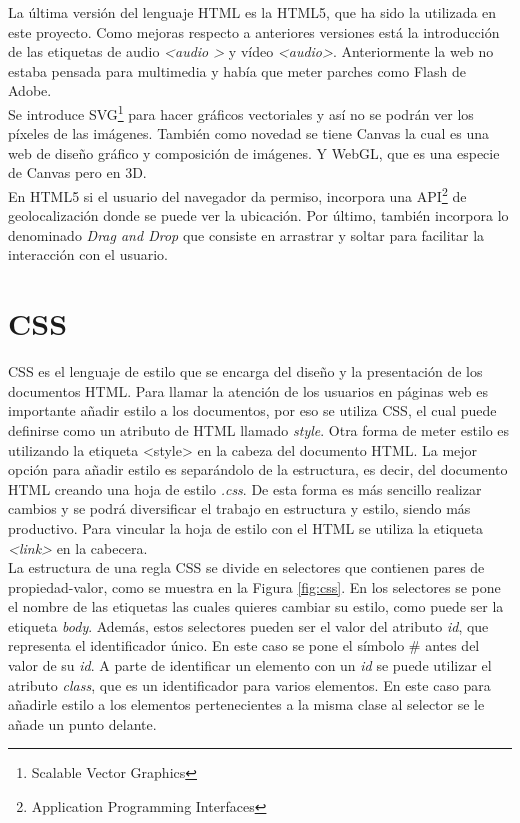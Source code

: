 La última versión del lenguaje HTML es la HTML5, que ha sido la utilizada en este proyecto. Como mejoras respecto a anteriores versiones está la introducción de las etiquetas de audio \textit{\textless audio \textgreater} y vídeo \textit{\textless audio\textgreater}. Anteriormente la web no estaba pensada para multimedia y había que meter parches como Flash de Adobe.\\

Se introduce SVG\footnote{Scalable Vector Graphics } para hacer gráficos vectoriales y así no se podrán ver los píxeles de las imágenes. También como novedad se tiene Canvas la cual es una web de diseño gráfico y composición de imágenes. Y WebGL, que es una especie de Canvas pero en 3D. \\

En HTML5 si el usuario del navegador da permiso, incorpora una API\footnote{Application Programming Interfaces} de geolocalización donde se puede ver la ubicación. Por último, también incorpora lo denominado \textit{Drag and Drop} que consiste en arrastrar y soltar para facilitar la interacción con el usuario.\\


\newpage
\section{CSS}
CSS es el lenguaje de estilo que se encarga del diseño y la presentación de los documentos HTML. Para llamar la atención de los usuarios en páginas web es importante añadir estilo a los documentos, por eso se utiliza CSS, el cual puede definirse como un atributo de HTML llamado \textit{style}. Otra forma de meter estilo es utilizando la etiqueta {\textless style\textgreater} en la cabeza del documento HTML. La mejor opción para añadir estilo es separándolo de la estructura, es decir, del documento HTML creando una hoja de estilo \textit{.css}. De esta forma es más sencillo realizar cambios y se podrá diversificar el trabajo en estructura y estilo, siendo más productivo. Para vincular la hoja de estilo con el HTML se utiliza la etiqueta \textit{\textless link\textgreater} en la cabecera.\\

La estructura de una regla CSS se divide en selectores que contienen pares de propiedad-valor, como se muestra en la Figura \ref{fig:css}. En los selectores se pone el nombre de las etiquetas las cuales quieres cambiar su estilo, como puede ser la etiqueta \textit{body}. Además, estos selectores pueden ser el valor del atributo \textit{id}, que representa el identificador único. En este caso se pone el símbolo \# antes del valor de su \textit{id}. A parte de identificar un elemento con un \textit{id} se puede utilizar el atributo \textit{class}, que es un identificador para varios elementos. En este caso para añadirle estilo a los elementos pertenecientes a la misma clase al selector se le añade un punto delante.

